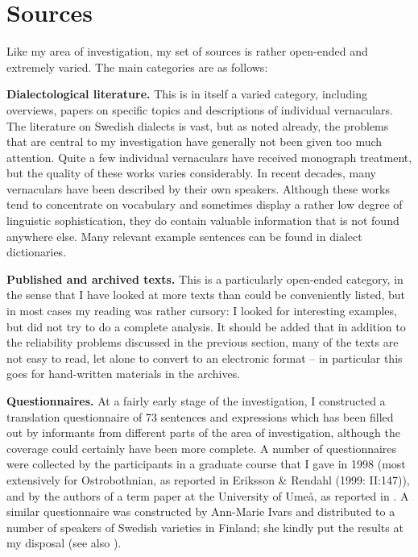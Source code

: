 
\section{Sources}

Like my area of investigation, my set of sources is rather open-ended and extremely varied. The main categories are as follows:


\textbf{Dialectological literature. }This is in itself a varied category, including overviews, papers on specific topics and descriptions of individual vernaculars. The literature on Swedish dialects is vast, but as noted already, the problems that are central to my investigation have generally not been given too much attention. Quite a few individual vernaculars have received monograph treatment, but the quality of these works varies considerably. In recent decades, many vernaculars have been described by their own speakers. Although these works tend to concentrate on vocabulary and sometimes display a rather low degree of linguistic sophistication, they do contain valuable information that is not found anywhere else. Many relevant example sentences can be found in dialect dictionaries. 


\textbf{Published and archived texts.} This is a particularly open-ended category, in the sense that I have looked at more texts than could be conveniently listed, but in most cases my reading was rather cursory: I looked for interesting examples, but did not try to do a complete analysis. It should be added that in addition to the reliability problems discussed in the previous section, many of the texts are not easy to read, let alone to convert to an electronic format – in particular this goes for hand-written materials in the archives. 


\textbf{Questionnaires. }At a fairly early stage of the investigation, I constructed a translation questionnaire of 73 sentences and expressions which has been filled out by informants from different parts of the area of investigation, although the coverage could certainly have been more complete. A number of questionnaires were collected by the participants in a graduate course that I gave in 1998 (most extensively for Ostrobothnian, as reported in Eriksson \& Rendahl (1999: II:147)), and by the authors of a term paper at the University of Umeå, as reported in \citet{BergholmEtAl1999}. A similar questionnaire was constructed by Ann-Marie Ivars and distributed to a number of speakers of Swedish varieties in Finland; she kindly put the results at my disposal (see also \citet{Ivars2005}).

